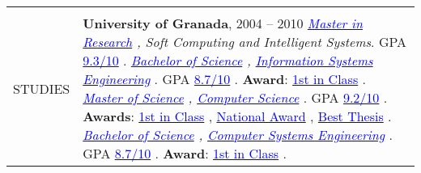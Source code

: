 \documentclass[letterpaper,10pt,oneside]{article}
\newcommand{\DatestampY}[1]{#1}
\newcommand{\sref}[2]{%
    \href{https://0/local/attachments/#1}{\textcolor{blue}{#2}}%
}
\newenvironment{body}
{\par\par
\begin{longtable}{p{0.145\textwidth}p{0.81\textwidth}}}
{\par\end{longtable}\par}
\renewcommand{\section}[3]{\\[-0.35cm]\pdfbookmark[2]{#2}{#3}\\%
\raggedleft  %
{\fontsize{9.5pt}{9.5pt}\selectfont\bfseries\raggedright%
\MakeUppercase{#1}}&}
\begin{document}
\begin{body}
\section{Studies}{Studies}{PDF:Studies}

\textbf{University of Granada}, \DatestampY{2004} -- \DatestampY{2010} \newline
\phantom{g}\textit{\sref{MRes-SoftComputingArtificialIntelligence-Diploma.pdf}{Master in Research}, Soft Computing and Intelligent Systems}. GPA \sref{MRes-SoftComputingArtificialIntelligence-Transcript-Spanish.pdf}{9.3/10}.\newline
\phantom{g}\textit{\sref{BSc-ManagementInformationTechnology-Diploma.pdf}{Bachelor of Science}, \sref{BSc-ManagementInformationTechnology-Transcript.pdf}{Information Systems Engineering}}. GPA \sref{BSc-ManagementInformationTechnology-Transcript-Spanish.pdf}{8.7/10}. \textbf{Award}: \sref{BSc-ManagementInformationTechnology-Award-FirstOfPromotion.pdf}{1st in Class}.\newline
\phantom{g}\textit{\sref{MSc-ComputerEngineering-Diploma.pdf}{Master of Science}, \sref{MSc-ComputerEngineering-Transcript.pdf}{Computer Science}}. GPA \sref{MSc-ComputerEngineering-Transcript-Spanish.pdf}{9.2/10}. \textbf{Awards}: \sref{MSc-ComputerEngineering-Award-FirstOfPromotion.pdf}{1st in Class}, \sref{MSc-ComputerEngineering-Award-NationalAward.pdf}{National Award}, \sref{MSc-ComputerEngineering-Award-BestMasterThesis.pdf}{Best Thesis}.\newline
\phantom{g}\textit{\sref{BSc-SystemInformationTechnology-Diploma.pdf}{Bachelor of Science}, \sref{BSc-SystemInformationTechnology-Transcript.pdf}{Computer Systems Engineering}}. GPA \sref{BSc-SystemInformationTechnology-Transcript-Spanish.pdf}{8.7/10}. \textbf{Award}: \sref{BSc-SystemInformationTechnology-Award-FirstOfPromotion.pdf}{1st in Class}.


\end{body}
\end{document}
